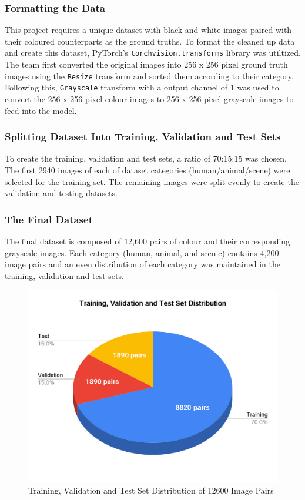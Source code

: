 \documentclass{article} %
\begin{document}
\subsubsection{Formatting the Data}

This project requires a unique dataset with black-and-white images paired with their coloured counterparts as the ground truths. To format the cleaned up data and create this dataset, PyTorch’s \verb|torchvision.transforms| library was utiltized. The team first converted the original images into 256 x 256 pixel ground truth images using the \verb|Resize| transform and sorted them according to their category. Following this, \verb|Grayscale| transform with a output channel of 1 was used to convert the 256 x 256 pixel colour images to 256 x 256 pixel grayscale images to feed into the model. 

 \subsubsection{Splitting Dataset Into Training, Validation and Test Sets}

To create the training, validation and test sets, a ratio of 70:15:15 was chosen. The first 2940 images of each of dataset categories (human/animal/scene) were selected for the training set. The remaining images were split evenly to create the validation and testing datasets. 

\subsubsection{The Final Dataset}

The final dataset is composed of 12,600 pairs of colour and their corresponding grayscale images. Each category (human, animal, and scenic) contains 4,200 image pairs and an even distribution of each category was maintained in the training, validation and test sets.

\begin{figure}[htbp]            %
  \centering
  \includegraphics[width=0.65\linewidth]{Figs/dataset1.png}
  \caption{Training, Validation and Test Set Distribution of 12600 Image Pairs}
  \label{fig:dataset}
\end{figure}
\end{document}
